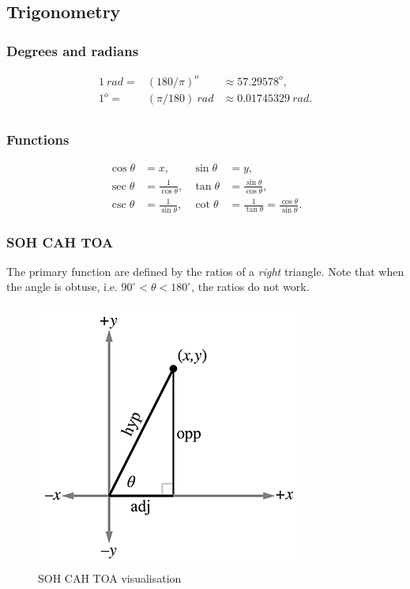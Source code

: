 \documentclass[a4paper,11pt]{article}
\begin{document}
\subsection{Trigonometry}

\subsubsection{Degrees and radians}

\[
\begin{array}{rll}
{1\ {rad} =} & {\left( 180/\pi \right)^{o}} & {\approx 57.29578^{o},} \\
{1^{o} =} & {\left( \pi/180 \right)\ {rad}} & {\approx 0.01745329\ {rad}.} \\
\end{array}
\]


\subsubsection{Functions}

\begin{align*}
\cos\theta &=x, &\sin\theta &=y, \\
\sec\theta &=\frac{1}{\cos\theta}, &\tan\theta &=\frac{\sin\theta}{\cos\theta}, \\
\csc\theta &=\frac{1}{\sin\theta}, &\cot\theta &=\frac{1}{\tan\theta}=\frac{\cos\theta}{\sin\theta}.
\end{align*}

\subsubsection{SOH CAH TOA}

The primary function are defined by the ratios of a \emph{right} triangle. Note that when the angle is obtuse, i.e. $90^\circ < \theta < 180^\circ$, the ratios do not work.

\begin{figure}[H]
\centering
    \includegraphics{01_sohcahtoa}
\caption{SOH CAH TOA visualisation}
\label{fig:soh-cah-toa-visualization}
\end{figure}
\end{document}
